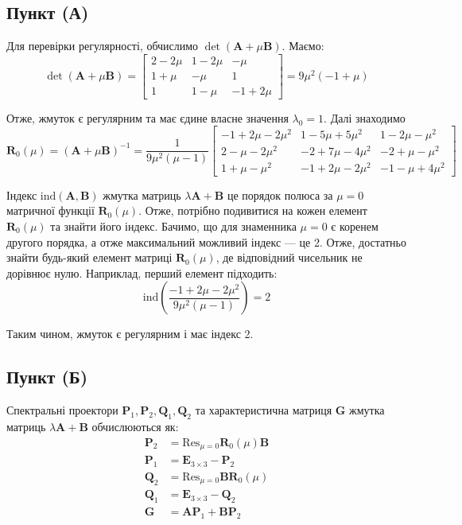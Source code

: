 \documentclass{hw_template}
\begin{document}
\subsection{Пункт (А)}
Для перевірки регулярності, обчислимо $\det(\boldsymbol{A} + \mu\boldsymbol{B})$. Маємо:
\begin{equation*}
    \det(\boldsymbol{A} + \mu\boldsymbol{B}) = \begin{bmatrix}
        2-2\mu & 1-2\mu & -\mu \\
        1+\mu & -\mu & 1 \\
        1 & 1-\mu & -1+2\mu
    \end{bmatrix} = 9\mu^2(-1+\mu)
\end{equation*}

Отже, жмуток є регулярним та має єдине власне значення $\lambda_0=1$. Далі знаходимо
\begin{equation*}
    \boldsymbol{R}_0(\mu) = (\boldsymbol{A}+\mu\boldsymbol{B})^{-1} = \frac{1}{9\mu^2(\mu-1)}\begin{bmatrix}
        -1+2\mu-2\mu^2 & 1-5\mu+5\mu^2 & 1 - 2\mu - \mu^2 \\
        2-\mu-2\mu^2 & -2+7\mu-4\mu^2 & -2+\mu-\mu^2 \\
        1 + \mu - \mu^2 & -1+2\mu-2\mu^2 & -1-\mu+4\mu^2
    \end{bmatrix}
\end{equation*}

Індекс $\text{ind}(\boldsymbol{A},\boldsymbol{B})$ жмутка матриць
$\lambda\boldsymbol{A}+\boldsymbol{B}$ це порядок полюса за $\mu=0$ матричної
функції $\boldsymbol{R}_0(\mu)$. Отже, потрібно подивитися на кожен елемент
$\boldsymbol{R}_0(\mu)$ та знайти його індекс. Бачимо, що для знаменника
$\mu=0$ є коренем другого порядка, а отже максимальний можливий індекс --- це 2.
Отже, достатньо знайти будь-який елемент матриці $\boldsymbol{R}_0(\mu)$, де 
відповідний чисельник не дорівнює нулю. Наприклад, перший елемент підходить:
\begin{equation*}
    \text{ind}\left(\frac{-1+2\mu-2\mu^2}{9\mu^2(\mu-1)}\right) = 2
\end{equation*}

Таким чином, жмуток є регулярним і має індекс 2.

\subsection{Пункт (Б)}
Спектральні проектори
$\boldsymbol{P}_1,\boldsymbol{P}_2,\boldsymbol{Q}_1,\boldsymbol{Q}_2$ та
характеристична матриця $\boldsymbol{G}$ жмутка матриць
$\lambda\boldsymbol{A}+\boldsymbol{B}$ обчислюються як:
\begin{align*}
    \boldsymbol{P}_2 &= \text{Res}_{\mu=0}\boldsymbol{R}_0(\mu)\boldsymbol{B} \\
    \boldsymbol{P}_1 &= \boldsymbol{E}_{3 \times 3} - \boldsymbol{P}_2 \\
    \boldsymbol{Q}_2 &= \text{Res}_{\mu=0}\boldsymbol{BR}_0(\mu) \\
    \boldsymbol{Q}_1 &= \boldsymbol{E}_{3 \times 3} - \boldsymbol{Q}_2 \\
    \boldsymbol{G} &= \boldsymbol{AP}_1 + \boldsymbol{BP}_2
\end{align*}
\end{document}
